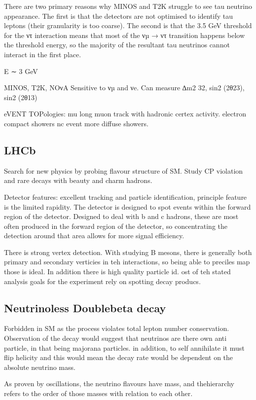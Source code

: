 \documentclass[]{article}
\begin{document}
	There are two primary reasons why MINOS and T2K struggle to see tau
	neutrino appearance. The first is that the detectors are not optimised to
	identify tau leptons (their granularity is too coarse). The second is that
	the 3.5 GeV threshold for the ντ interaction means that most of the νµ →
	ντ transition happens below the threshold energy, so the majority of the
	resultant tau neutrinos cannot interact in the first place.
	
E ∼ 3 GeV

MINOS, T2K, NOνA Sensitive to νµ and νe. Can measure ∆m2
32, sin2
(2θ23),
sin2
(2θ13)


eVENT TOPologies: mu long muon track with hadronic certex activity. electron compact showers nc event more diffuse showers.

\subsection{LHCb}

Search for new physics by probing flavour structure of SM. Study CP violation and rare decays with beauty and charm hadrons.  

Detector features: excellent tracking and particle identification, principle feature is the limited rapidity. The detector is designed to spot events within the forward region of the detector. Designed to deal with b and c hadrons, these are most often produced in the forward region of the detector, so concentrating the detection around that area allows for more signal efficiency. 

There is strong vertex detection. With studying B mesons, there is generally both primary and secondary verticies in teh interactions, so being able to preciles map those is ideal. In addition there is high quality particle id. ost of teh stated analysis goals for the experiment rely on spotting decay producs. 

\subsection{Neutrinoless Doublebeta decay}

Forbidden in SM as the process violates total lepton number conservation. Observation of the decay would suggest that neutrinos are there own anti particle, in that being majorana particles. in addition, to self annihilate it must flip helicity and this would mean the decay rate would be dependent on the absolute neutrino mass.

As proven by oscillations, the neutrino flavours have mass, and thehierarchy refers to the order of those masses with relation to each other. 
\end{document}
